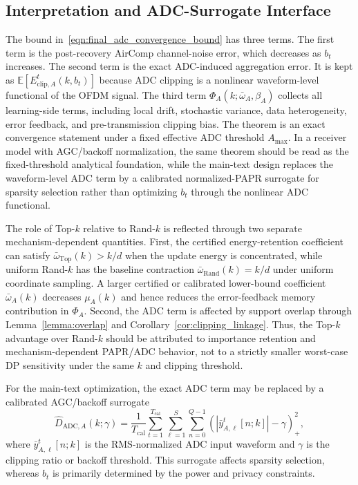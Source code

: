 \documentclass[conference]{IEEEtran}
\begin{document}
\subsection{Interpretation and ADC-Surrogate Interface}

The bound in~\eqref{eqn:final_adc_convergence_bound} has three terms. The first term is the post-recovery AirComp channel-noise error, which decreases as $b_t$ increases. The second term is the exact ADC-induced aggregation error. It is kept as $\mathbb{E}[E_{\mathrm{clip},A}^t(k,b_t)]$ because ADC clipping is a nonlinear waveform-level functional of the OFDM signal. The third term $\Phi_A(k;\bar{\omega}_A,\beta_A)$ collects all learning-side terms, including local drift, stochastic variance, data heterogeneity, error feedback, and pre-transmission clipping bias. The theorem is an exact convergence statement under a fixed effective ADC threshold $A_{\max}$. In a receiver model with AGC/backoff normalization, the same theorem should be read as the fixed-threshold analytical foundation, while the main-text design replaces the waveform-level ADC term by a calibrated normalized-PAPR surrogate for sparsity selection rather than optimizing $b_t$ through the nonlinear ADC functional.

The role of Top-$k$ relative to Rand-$k$ is reflected through two separate mechanism-dependent quantities. First, the certified energy-retention coefficient can satisfy $\bar{\omega}_{\mathrm{Top}}(k)> k/d$ when the update energy is concentrated, while uniform Rand-$k$ has the baseline contraction $\bar{\omega}_{\mathrm{Rand}}(k)=k/d$ under uniform coordinate sampling. A larger certified or calibrated lower-bound coefficient $\bar{\omega}_A(k)$ decreases $\mu_A(k)$ and hence reduces the error-feedback memory contribution in $\Phi_A$. Second, the ADC term is affected by support overlap through Lemma~\ref{lemma:overlap} and Corollary~\ref{cor:clipping_linkage}. Thus, the Top-$k$ advantage over Rand-$k$ should be attributed to importance retention and mechanism-dependent PAPR/ADC behavior, not to a strictly smaller worst-case DP sensitivity under the same $k$ and clipping threshold.

For the main-text optimization, the exact ADC term may be replaced by a calibrated AGC/backoff surrogate
\begin{equation}
    \widehat D_{\mathrm{ADC},A}(k;\gamma)
    =\frac{1}{T_{\mathrm{cal}}}
    \sum_{t=1}^{T_{\mathrm{cal}}}\sum_{\ell=1}^{S}\sum_{n=0}^{Q-1}
    \left(|\bar y_{A,\ell}^t[n;k]|-\gamma\right)_+^2,
\end{equation}
where $\bar y_{A,\ell}^t[n;k]$ is the RMS-normalized ADC input waveform and $\gamma$ is the clipping ratio or backoff threshold. This surrogate affects sparsity selection, whereas $b_t$ is primarily determined by the power and privacy constraints.
\end{document}
